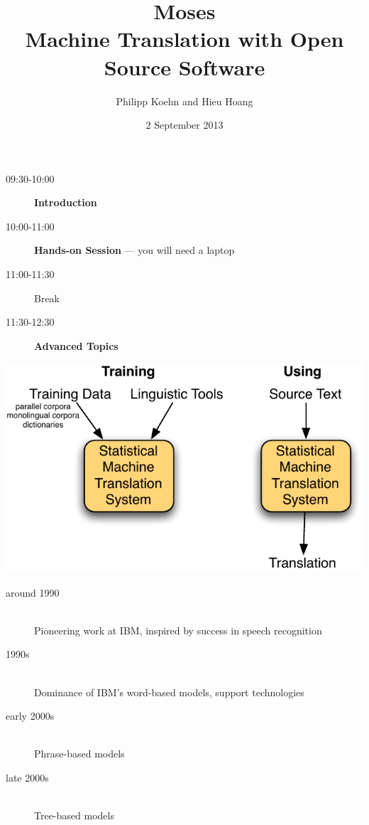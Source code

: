\documentclass[landscape]{uedslides2C}
\begin{document}
\title[Machine Translation with Open Source Software]{{\sc \huge Moses}\\[3mm] Machine Translation with Open Source Software}
\author[Koehn and Hoang]{Philipp Koehn  and Hieu Hoang}
\date{\vspace{-5mm}2 September 2013}
\maketitle


\vspace{20mm}
\begin{description}
\item[\small 09:30-10:00 $\;\;$] {\bf Introduction}
\item[\small 10:00-11:00 $\;\;$] {\bf Hands-on Session} --- you will need a laptop
\item[\small 11:00-11:30 $\;\;$] Break
\item[\small 11:30-12:30 $\;\;$] {\bf Advanced Topics}
\end{description}


\vspace{15mm}
\begin{center}
\includegraphics[scale=1.8]{basics.pdf}
\end{center}


\vspace{10mm}
\begin{description}
\item[around 1990] $\;$\\[2mm] Pioneering work at IBM, inspired by success in speech recognition
\item[1990s] $\;$\\[2mm] Dominance of IBM's word-based models, support technologies
\item[early 2000s] $\;$\\[2mm] Phrase-based models
\item[late 2000s] $\;$\\[2mm] Tree-based models
\end{description}
\end{document}
